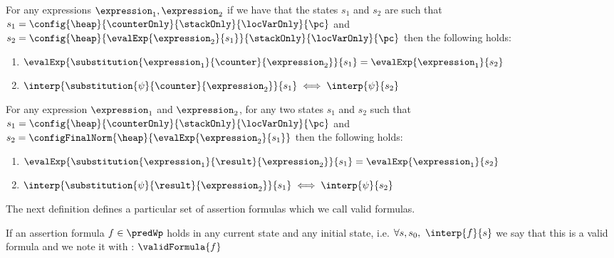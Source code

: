 \begin{substCntr}\label{substCntr}
For any expressions $ \expression_1, \expression_2 $ 
if we have that the states $s_1$ and $s_2$ are such that
 $s_1 =   \config{\heap}{\counterOnly}{ \stackOnly }{\locVarOnly}{\pc }$ and 
$s_2 =  \config{\heap}{\evalExp{ \expression_2}{ s_1  } }{ \stackOnly }{\locVarOnly}{\pc }  $ then 
the following holds:
\begin{enumerate}
      \item $\evalExp{\substitution{\expression_1}{ \counter }{ \expression_2 }}{ s_1 } = \evalExp{\expression_1}{s_2} $
      \item $\interp{\substitution{\psi}{ \counter }{ \expression_2 }}{ s_1 } \iff \interp{\psi}{s_2} $
\end{enumerate}
\end{substCntr} 




\begin{substRet}\label{substRet} 
For any expression $\expression_1$ and $\expression_2$,
for any two states $s_1$ and $s_2$  such that
$ s_1 =   \config{\heap}{\counterOnly}{ \stackOnly }{\locVarOnly}{\pc }$ and \\
$ s_2 =   \configFinalNorm{\heap}{\evalExp{\expression_2}{s_1} } $ then 
the following holds:
\begin{enumerate}
      \item $\evalExp{\substitution{\expression_1}{ \result }{ \expression_2 }}{ s_1 } = \evalExp{\expression_1}{s_2} $
      \item $\interp{\substitution{\psi}{ \result}{ \expression_2 }}{ s_1 } \iff \interp{\psi}{s_2} $
\end{enumerate}
\end{substRet}


The next definition defines a particular set of assertion formulas which we call valid formulas.
\begin{valid}
  If an assertion formula  $ f \in \predWp $ holds in any current state and any initial state, i.e.
$\forall s, s_{0}, \  \interp{f}{s} $ we say that this is a valid formula and we note it with :
  $\validFormula{f} $ 
\end{valid}




